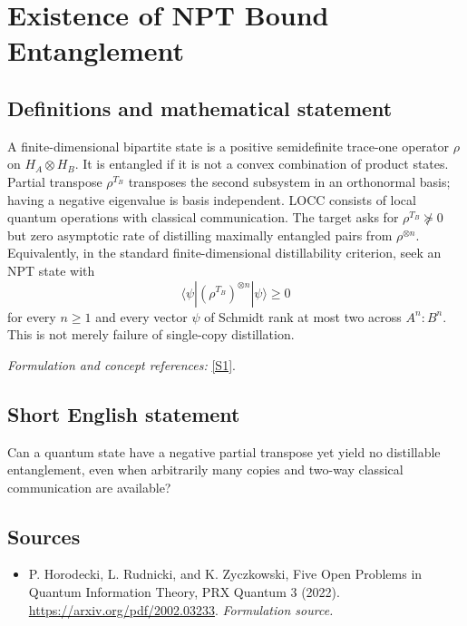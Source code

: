\documentclass[11pt]{article}
\begin{document}
\section*{\texorpdfstring{Existence of NPT Bound Entanglement}{Existence of NPT Bound Entanglement}}\label{276}
\subsection{Definitions and mathematical statement}
A finite-dimensional bipartite state is a positive semidefinite trace-one operator $\rho$ on $H_A\otimes H_B$. It is entangled if it is not a convex combination of product states. Partial transpose $\rho^{T_B}$ transposes the second subsystem in an orthonormal basis; having a negative eigenvalue is basis independent. LOCC consists of local quantum operations with classical communication. The target asks for $\rho^{T_B}\not\succeq0$ but zero asymptotic rate of distilling maximally entangled pairs from $\rho^{\otimes n}$. Equivalently, in the standard finite-dimensional distillability criterion, seek an NPT state with
\[
 \langle\psi|(\rho^{T_B})^{\otimes n}|\psi\rangle\ge0
\]
for every $n\ge1$ and every vector $\psi$ of Schmidt rank at most two across $A^n:B^n$. This is not merely failure of single-copy distillation.
\par\smallskip\textit{Formulation and concept references:} \href{https://arxiv.org/pdf/2002.03233}{[S1]}.

\subsection{Short English statement}
Can a quantum state have a negative partial transpose yet yield no distillable entanglement, even when arbitrarily many copies and two-way classical communication are available?
\subsection{Sources}
\begin{itemize}
\item[S1]P. Horodecki, L. Rudnicki, and K. Zyczkowski, Five Open Problems in Quantum Information Theory, PRX Quantum 3 (2022).
\url{https://arxiv.org/pdf/2002.03233}.
\textit{Formulation source.}
\end{itemize}
\end{document}
